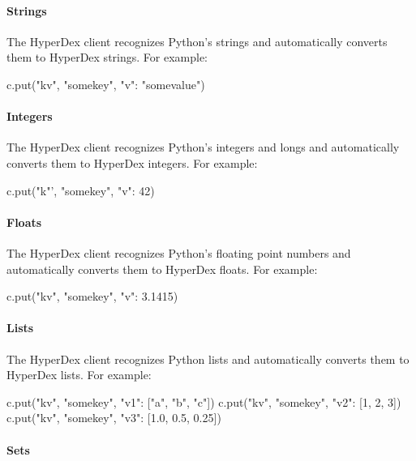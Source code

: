 \paragraph{Strings}

The HyperDex client recognizes Python's strings and automatically converts them
to HyperDex strings.  For example:

\begin{pythoncode}
c.put("kv", "somekey", {"v": "somevalue"})
\end{pythoncode}

\paragraph{Integers}

The HyperDex client recognizes Python's integers and longs and automatically
converts them to HyperDex integers.  For example:

\begin{pythoncode}
c.put("k"', "somekey", {"v": 42})
\end{pythoncode}

\paragraph{Floats}

The HyperDex client recognizes Python's floating point numbers and
automatically converts them to HyperDex floats.  For example:

\begin{pythoncode}
c.put("kv", "somekey", {"v": 3.1415})
\end{pythoncode}

\paragraph{Lists}

The HyperDex client recognizes Python lists and automatically converts them to
HyperDex lists.  For example:

\begin{pythoncode}
c.put("kv", "somekey", {"v1": ["a", "b", "c"]})
c.put("kv", "somekey", {"v2": [1, 2, 3]})
c.put("kv", "somekey", {"v3": [1.0, 0.5, 0.25]})
\end{pythoncode}

\paragraph{Sets}


